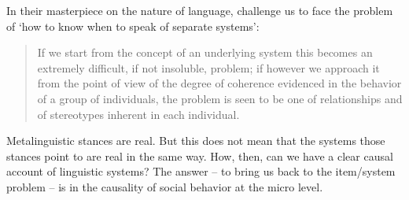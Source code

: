 In their masterpiece on the nature of language, \citet[8--9]{le_page_acts_1985} challenge us to face the problem of \textquoteleft how to 
know when to speak of separate systems': 



\begin{quotation}
If we start from the concept of an underlying system this becomes an 
extremely difficult, if not insoluble, problem; if however we approach 
it from the point of view of the degree of coherence evidenced in the 
behavior of a group of individuals, the problem is seen to be one of 
relationships and of stereotypes inherent in each individual.  
\end{quotation}




Metalinguistic stances are real. But this does not mean that the systems 
those stances point to are real in the same way. How, then, can we have a clear 
causal account of linguistic systems? The answer -- to bring us back to the 
item/system problem -- is in the causality of social behavior at the micro 
level.






